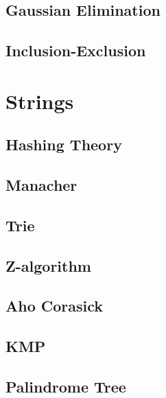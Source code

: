 \subsection{Gaussian Elimination}
\raggedbottom

\subsection{Inclusion-Exclusion}
\raggedbottom

\section{Strings}
\subsection{Hashing Theory}
\raggedbottom
\subsection{Manacher}
\raggedbottom
\subsection{Trie}
\raggedbottom
\subsection{Z-algorithm}
\raggedbottom
\subsection{Aho Corasick}
\raggedbottom
\subsection{KMP}
\raggedbottom
\subsection{Palindrome Tree}
\raggedbottom
